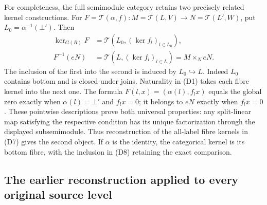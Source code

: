 For completeness, the full semimodule category retains two
precisely related kernel constructions. For
\(F=\mathcal T(\alpha,f):M=\mathcal T(L,V)\to
N=\mathcal T(L',W)\), put \(L_0=\alpha^{-1}(\bot')\). Then
\[
\begin{aligned}
 \ker_{G(R)}F&=\mathcal T(L_0,(\ker f_l)_{l\in L_0}),\\
 F^{-1}(eN)&=\mathcal T(L,(\ker f_l)_{l\in L})
             =M\mathbin{\times}_N eN.
\end{aligned}
\tag{D8}
\]
The inclusion of the first into the second is induced by
\(L_0\hookrightarrow L\). Indeed \(L_0\) contains bottom and is
closed under joins. Naturality in (D1) takes each fibre kernel
into the next one. The formula
\(F(l,x)=(\alpha(l),f_lx)\) equals the global zero exactly when
\(\alpha(l)=\bot'\) and \(f_lx=0\); it belongs to \(eN\)
exactly when \(f_lx=0\). These pointwise descriptions prove both
universal properties: any split-linear map satisfying the
respective condition has its unique factorization through the
displayed subsemimodule. Thus reconstruction of the all-label
fibre kernels in (D7) gives the second object. If \(\alpha\) is
the identity, the categorical kernel is its bottom fibre, with
the inclusion in (D8) retaining the exact comparison.

\subsection{The earlier reconstruction applied to every original source level}
\label{sec:support-propagated-original-levels}

